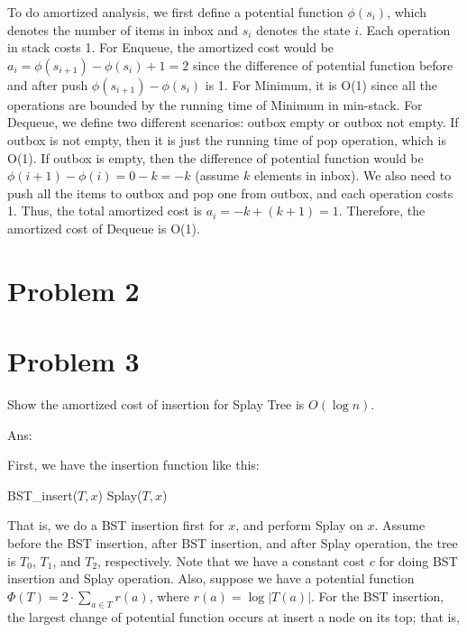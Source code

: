 \begin{enumerate}
To do amortized analysis, we first define a potential function $\phi(s_i)$, which denotes the number of items in inbox and $s_i$ denotes the state $i$.  Each operation in stack costs 1.  For Enqueue, the amortized cost would be $a_i = \phi(s_{i+1})-\phi(s_i)+1 = 2$ since the difference of potential function before and after push $\phi(s_{i+1})-\phi(s_i)$ is 1.  For Minimum, it is O(1) since all the operations are bounded by the running time of Minimum in min-stack.  For Dequeue, we define two different scenarios: outbox empty or outbox not empty.  If outbox is not empty, then it is just the running time of pop operation, which is O(1).  If outbox is empty, then the difference of potential function would be $\phi(i+1)-\phi(i) = 0 - k = -k$ (assume $k$ elements in inbox).  We also need to push all the items to outbox and pop one from outbox, and each operation costs 1.  Thus, the total amortized cost is $a_i = -k + (k + 1) = 1$.  Therefore, the amortized cost of Dequeue is O(1).


\end{enumerate}

\section*{Problem 2}

\section*{Problem 3}
Show the amortized cost of insertion for Splay Tree is $O(\log n)$.

Ans:

First, we have the insertion function like this:

\begin{algorithmic}[0]
 
    \State BST\_insert($T, x$) 
    \State Splay($T, x$) 
\EndProcedure
\end{algorithmic}

That is, we do a BST insertion first for $x$, and perform Splay on $x$.  Assume before the BST insertion, after BST insertion, and after Splay operation, the tree is $T_0$, $T_1$, and $T_2$, respectively.  Note that we have a constant cost $c$ for doing BST insertion and Splay operation.  Also, suppose we have a potential function $\Phi(T) = 2 \cdot \sum_{a\in T}r(a)$, where $r(a) = \log|T(a)|$.  For the BST insertion, the largest change of potential function occurs at insert a node on its top; that is,

